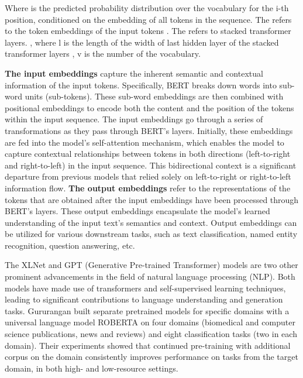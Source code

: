 \documentclass[]{ceurart}
\begin{document}
Where  is the predicted probability distribution over the vocabulary for the i-th position, conditioned on the embedding of all tokens in the sequence. The   refers to the token embeddings of the input tokens . The  refers to stacked transformer layers. , where l is the length of the width of last hidden layer of the stacked transformer layers , v is the number of the vocabulary.

\textbf{The input embeddings}  capture the inherent semantic and contextual information of the input tokens. Specifically, BERT breaks down words into sub-word units (sub-tokens). These sub-word embeddings are then combined with positional embeddings to encode both the content and the position of the tokens within the input sequence. The input embeddings go through a series of transformations as they pass through BERT's layers. Initially, these embeddings are fed into the model's self-attention mechanism, which enables the model to capture contextual relationships between tokens in both directions (left-to-right and right-to-left) in the input sequence. This bidirectional context is a significant departure from previous models that relied solely on left-to-right or right-to-left information flow.  \textbf{The output embeddings} refer to the representations of the tokens that are obtained after the input embeddings have been processed through BERT's layers. These output embeddings encapsulate the model's learned understanding of the input text's semantics and context. Output embeddings can be utilized for various downstream tasks, such as text classification, named entity recognition, question answering, etc. 

The XLNet \cite{yang_xlnet_2019} and GPT (Generative Pre-trained Transformer) \cite{brown_language_2020} models are two other prominent advancements in the field of natural language processing (NLP). Both models have made use of transformers and self-supervised learning techniques, leading to significant contributions to language understanding and generation tasks. Gururangan \cite{gururangan_dont_2020} built separate pretrained models for specific domains with a universal language model ROBERTA on four domains (biomedical and computer science publications, news and reviews) and eight classification tasks (two in each domain). Their experiments showed that continued pre-training with additional corpus on the domain consistently improves performance on tasks from the target domain, in both high- and low-resource settings.  
\end{document}
